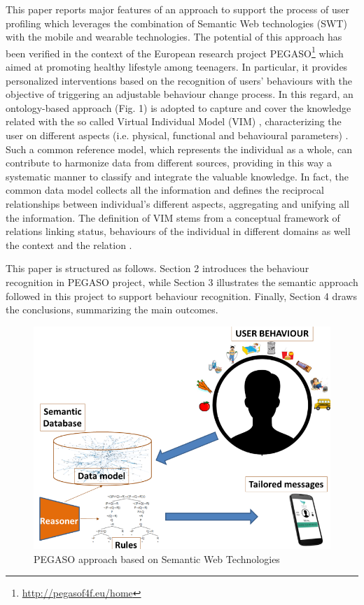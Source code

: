 \documentclass[runningheads,a4paper]{llncs}
\makeatletter
\def\maxwidth#1{\ifdim\Gin@nat@width>#1 #1\else\Gin@nat@width\fi}
\makeatother
\begin{document}
This paper reports major features of an approach to support the process of user profiling which leverages the combination of Semantic Web technologies (SWT)  \cite{_Ref490677097} with the mobile and wearable technologies. The potential of this approach has been verified in the context of the European research project PEGASO\footnote{\url{http://pegasof4f.eu/home}} \cite{_Ref490677114} which aimed at promoting healthy lifestyle among teenagers. In particular, it provides personalized interventions based on the recognition of users' behaviours with the objective of triggering an adjustable behaviour change process. In this regard, an ontology-based approach (Fig. 1)  \cite{_Ref490677130} is adopted to capture and cover the knowledge related with the so called Virtual Individual Model (VIM)  \cite{_Ref490677147}, characterizing the user on different aspects (i.e. physical, functional and behavioural parameters)  \cite{_Ref490677160}. Such a common reference model, which represents the individual as a whole, can contribute to harmonize data from different sources, providing in this way a systematic manner to classify and integrate the valuable knowledge. In fact, the common data model collects all the information and defines the reciprocal relationships between individual's different aspects, aggregating and unifying all the information. The definition of VIM stems from a conceptual framework of relations linking status, behaviours of the individual in different domains as well the context and the relation  \cite{_Ref490677173}.  

This paper is structured as follows. Section 2 introduces the behaviour recognition in PEGASO project, while Section 3 illustrates the semantic approach followed in this project to support behaviour recognition. Finally, Section 4 draws the conclusions, summarizing the main outcomes.
\begin{figure}[h!]
\centering
\includegraphics[width=\maxwidth{\textwidth}]{./img/image1.png}
\cprotect\caption{PEGASO approach based on Semantic Web Technologies}
\label{}
\end{figure}
\end{document}
